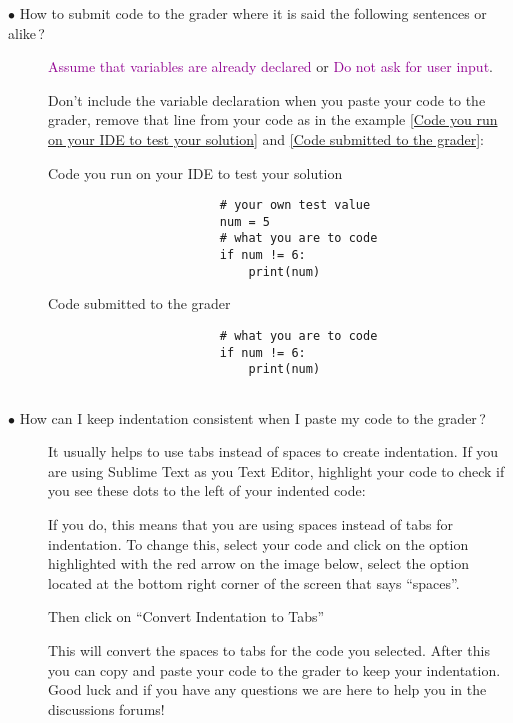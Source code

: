 \documentclass{article}
\newcommand{\question}[1]{\item[$\bullet$ #1] \hfil}
\newenvironment{answer}{}{}
\newenvironment{faq}{\begin{description}}{\end{description}}
\begin{document}
\begin{faq}
				\question{How to submit code to the grader where it is said the following sentences or alike\,?}
				
				\textcolor[HTML]{900090}{Assume that variables are already declared} or \textcolor[HTML]{900090}{Do not ask for user input}.
				
				\begin{answer}
					Don't include the variable declaration when you paste your code to the
					grader, remove that line from your code as in the example \textcolor{blue}{\ref{Code you run on your IDE to test your solution}} and \textcolor{blue}{\ref{Code submitted to the grader}}:
					
					\begin{table}[htb]
						\caption{Code you run on your IDE to test your solution}
						\label{Code you run on your IDE to test your solution}
						\begin{verbatim}
						# your own test value
						num = 5
						# what you are to code
						if num != 6:
						    print(num)  
						\end{verbatim}
					\end{table}
					
					\begin{table}[htb]
						\caption{Code submitted to the grader}
						\label{Code submitted to the grader}
						\begin{verbatim}
						# what you are to code
						if num != 6:
						    print(num)
						
						\end{verbatim}
					\end{table}
				\end{answer}
				
				\question{How can I keep indentation consistent when I paste my code to the grader\,?}
				
				\begin{answer}
					It usually helps to use tabs instead of spaces to create indentation.
					If you are using Sublime Text as you Text Editor, highlight your code to check if you see
					these dots to the left of your indented code:
					
					
					
					If you do, this means that you are using spaces instead of tabs for
					indentation. To change this, select your code and click on the option highlighted with
					the red arrow on the image below, select the option located at the bottom right corner
					of the screen that says ``spaces''.
					
					
					
					Then click on ``Convert Indentation to Tabs''
					
					
					
					This will convert the spaces to tabs for the code you selected. After this you
					can copy and paste your code to the grader to keep your indentation. Good luck and
					if you have any questions we are here to help you in the discussions forums!
				\end{answer}
			\end{faq}
		
\end{document}
